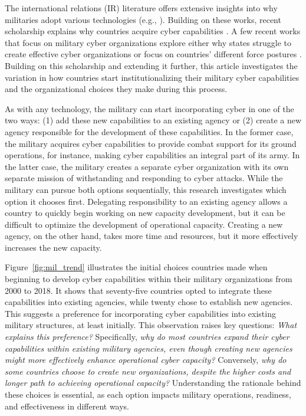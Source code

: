 \documentclass[12pt, letterpaper]{article}
\theoremstyle{plain}
\theoremstyle{remark}
\begin{document}
The international relations (IR) literature offers extensive insights into why militaries adopt various technologies (e.g., \citet{most1989logic, jo2007determinants, Horowitz2010PUP, Fuhrmann2017, Kahn2022JCR, Gannon2021use}). Building on these works, recent scholarship explains why countries acquire cyber capabilities \citep{gomez2016arming, valeriano2018cyber, Kostyuk2024JPR}. 
A few recent works that focus on military cyber organizations explore either why states struggle to create effective cyber organizations \citep{Smeets2022SS} or focus on countries' different force postures \citep{Blessing2020, Cunningham2022IS}. Building on this scholarship and extending it further, this article investigates the variation in how countries start institutionalizing their military cyber capabilities and the organizational choices they make during this process.


As with any technology, the military can  start incorporating cyber in one of the two ways: (1) add these new capabilities to an existing agency or (2) create a new agency responsible for the development of these capabilities. In the former case, the military acquires cyber capabilities to provide combat support for its ground operations, for instance, making cyber capabilities an integral part of its army. In the latter case, the military creates a separate cyber organization with its own separate mission of withstanding and responding to cyber attacks. While the military can pursue both options sequentially, this research investigates which option it chooses first. Delegating responsibility to an existing agency allows a country to quickly begin working on new capacity development, but it can be difficult to optimize the development of operational capacity. 
Creating a new agency, on the other hand, takes more time and resources, but it more effectively increases the new capacity. 



Figure~\ref{fig:mil_trend} illustrates the initial choices countries made when beginning to develop cyber capabilities within their military organizations from 2000 to 2018. It shows that seventy-five countries opted to integrate these capabilities into existing agencies, while twenty chose to establish new agencies. This suggests a preference for incorporating cyber capabilities into existing military structures, at least initially. This observation raises key questions: \textit{What explains this preference?} Specifically, \textit{why do most countries expand their cyber capabilities within existing military agencies, even though creating new agencies might more effectively enhance operational cyber capacity?} Conversely, \textit{why do some countries choose to create new organizations, despite the higher costs and longer path to achieving operational capacity?} Understanding the rationale behind these choices is essential, as each option impacts military operations, readiness, and effectiveness in different ways.
\end{document}
